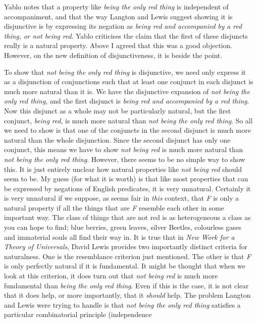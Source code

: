 \documentclass[
  10pt,
  letterpaper,
  DIV=11,
  numbers=noendperiod,
  twoside]{scrartcl}
\begin{document}
Yablo notes that a property like \emph{being the only red thing} is
independent of accompaniment, and that the way Langton and Lewis suggest
showing it is disjunctive is by expressing its negation as \emph{being
red and accompanied by a red thing, or not being red}. Yablo criticises
the claim that the first of these disjuncts really is a natural
property. Above I agreed that this was a good objection. However, on the
new definition of disjunctiveness, it is beside the point.

To show that \emph{not being the only red thing} is disjunctive, we need
only express it as a disjunction of conjunctions such that at least one
conjunct in each disjunct is much more natural than it is. We have the
disjunctive expansion of \emph{not being the only red thing}, and the
first disjunct is \emph{being red and accompanied by a red thing}. Now
this disjunct as a whole may not be particularly natural, but the first
conjunct, \emph{being red}, is much more natural than \emph{not being
the only red thing}. So all we need to show is that one of the conjuncts
in the second disjunct is much more natural than the whole disjunction.
Since the second disjunct has only one conjunct, this means we have to
show \emph{not being red} is much more natural than \emph{not being the
only red thing}. However, there seems to be no simple way to show this.
It is just entirely unclear how natural properties like \emph{not being
red} should seem to be. My guess (for what it is worth) is that like
most properties that can be expressed by negations of English
predicates, it is very unnatural. Certainly it is very unnatural if we
suppose, as seems fair in \emph{this} context, that \emph{F} is only a
natural property if all the things that are \emph{F} resemble each other
in some important way. The class of things that are not red is as
heterogeneous a class as you can hope to find; blue berries, green
leaves, silver Beetles, colourless gases and immaterial souls all find
their way in. It is true that in \emph{New Work for a Theory of
Universals}, David Lewis provides two importantly distinct criteria for
naturalness. One is the resemblance criterion just mentioned. The other
is that \emph{F} is only perfectly natural if it is fundamental. It
might be thought that when we look at this criterion, it does turn out
that \emph{not being red} is much more fundamental than \emph{being the
only red thing}. Even if this is the case, it is not clear that it does
help, or more importantly, that it \emph{should} help. The problem
Langton and Lewis were trying to handle is that \emph{not being the only
red thing} satisfies a particular combinatorial principle (independence
\end{document}
